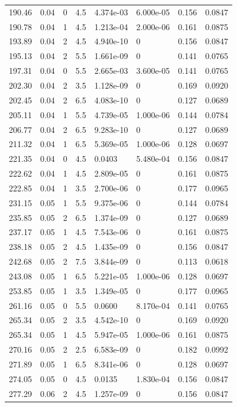 \documentclass[preview]{standalone}
\begin{document}
{{{\begin{tabular}{L{1.2cm}C{1.2cm} C{0.3cm}C{0.5cm} C{1.4cm}C{1.4cm} C{1.4cm}C{1.4cm}}
  190.46  &  0.04  & 0     & 4.5 &  4.374e-03  & 6.000e-05  & 0.156 &  0.0847   \\ 
  190.78  &  0.04  & 1     & 4.5 &  1.213e-04  & 2.000e-06  & 0.161 &  0.0875   \\ 
  193.89  &  0.04  & 2     & 4.5 &  4.940e-10  & 0  & 0.156 &  0.0847   \\ 
  195.13  &  0.04  & 2     & 5.5 &  1.661e-09  & 0  & 0.141 &  0.0765   \\ 
  197.31  &  0.04  & 0     & 5.5 &  2.665e-03  & 3.600e-05  & 0.141 &  0.0765   \\ 
  202.30  &  0.04  & 2     & 3.5 &  1.128e-09  & 0  & 0.169 &  0.0920   \\ 
  202.45  &  0.04  & 2     & 6.5 &  4.083e-10  & 0  & 0.127 &  0.0689   \\ 
  205.11  &  0.04  & 1     & 5.5 &  4.739e-05  & 1.000e-06  & 0.144 &  0.0784   \\ 
  206.77  &  0.04  & 2     & 6.5 &  9.283e-10  & 0  & 0.127 &  0.0689   \\ 
  211.32  &  0.04  & 1     & 6.5 &  5.369e-05  & 1.000e-06  & 0.128 &  0.0697   \\ 
  221.35  &  0.04  & 0     & 4.5 &  0.0403  & 5.480e-04  & 0.156 &  0.0847   \\ 
  222.62  &  0.04  & 1     & 4.5 &  2.809e-05  & 0  & 0.161 &  0.0875   \\ 
  222.85  &  0.04  & 1     & 3.5 &  2.700e-06  & 0  & 0.177 &  0.0965   \\ 
  231.15  &  0.05  & 1     & 5.5 &  9.375e-06  & 0  & 0.144 &  0.0784   \\ 
  235.85  &  0.05  & 2     & 6.5 &  1.374e-09  & 0  & 0.127 &  0.0689   \\ 
  237.17  &  0.05  & 1     & 4.5 &  7.543e-06  & 0  & 0.161 &  0.0875   \\ 
  238.18  &  0.05  & 2     & 4.5 &  1.435e-09  & 0  & 0.156 &  0.0847   \\ 
  242.68  &  0.05  & 2     & 7.5 &  3.844e-09  & 0  & 0.113 &  0.0618   \\ 
  243.08  &  0.05  & 1     & 6.5 &  5.221e-05  & 1.000e-06  & 0.128 &  0.0697   \\ 
  253.85  &  0.05  & 1     & 3.5 &  1.349e-05  & 0  & 0.177 &  0.0965   \\ 
  261.16  &  0.05  & 0     & 5.5 &  0.0600  & 8.170e-04  & 0.141 &  0.0765   \\ 
  265.34  &  0.05  & 2     & 3.5 &  4.542e-10  & 0  & 0.169 &  0.0920   \\ 
  265.34  &  0.05  & 1     & 4.5 &  5.947e-05  & 1.000e-06  & 0.161 &  0.0875   \\ 
  270.16  &  0.05  & 2     & 2.5 &  6.583e-09  & 0  & 0.182 &  0.0992   \\ 
  271.89  &  0.05  & 1     & 6.5 &  8.341e-06  & 0  & 0.128 &  0.0697   \\ 
  274.05  &  0.05  & 0     & 4.5 &  0.0135  & 1.830e-04  & 0.156 &  0.0847   \\ 
  277.29  &  0.06  & 2     & 4.5 &  1.257e-09  & 0  & 0.156 &  0.0847   \\ 
\hline 
\end{tabular} 

}}}
\end{document}
